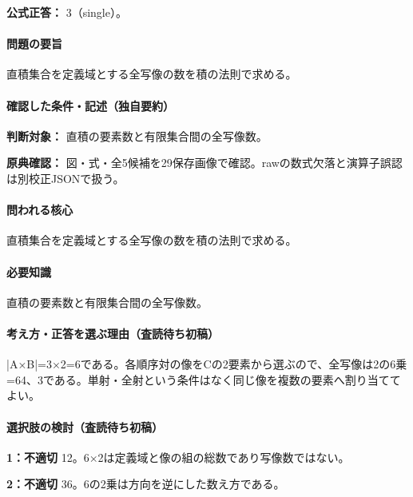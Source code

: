 \textbf{公式正答：} 3（single）。

\paragraph{問題の要旨} 直積集合を定義域とする全写像の数を積の法則で求める。

\paragraph{確認した条件・記述（独自要約）}\mbox{}\par

\noindent\textbf{判断対象：} 直積の要素数と有限集合間の全写像数。\par

\noindent\textbf{原典確認：} 図・式・全5候補を29保存画像で確認。rawの数式欠落と演算子誤認は別校正JSONで扱う。\par

\paragraph{問われる核心} 直積集合を定義域とする全写像の数を積の法則で求める。

\paragraph{必要知識} 直積の要素数と有限集合間の全写像数。

\paragraph{考え方・正答を選ぶ理由（査読待ち初稿）} |A×B|=3×2=\allowbreak{}6である。各順序対の像をCの2要素から選ぶので、全写像は2の6乗=64、3である。単射・全射という条件はなく同じ像を複数の要素へ割り当ててよい。

\paragraph{選択肢の検討（査読待ち初稿）}\mbox{}\par

\noindent\textbf{1：不適切} 12。6×2は定義域と像の組の総数であり写像数ではない。\par

\noindent\textbf{2：不適切} 36。6の2乗は方向を逆にした数え方である。\par

